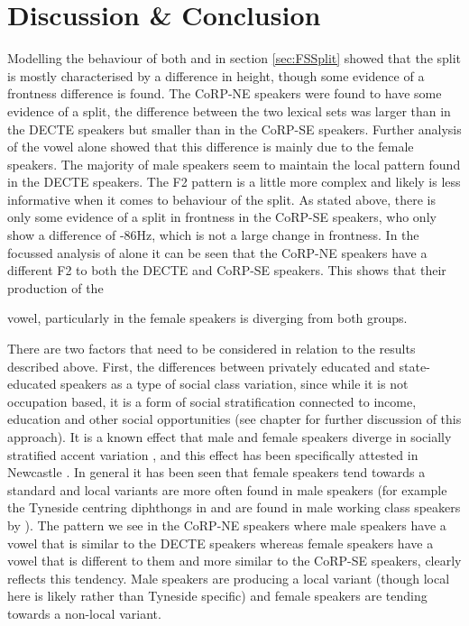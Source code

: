 \documentclass[../../../00.FullDoc/tex/ThesisSkeleton-draft2]{subfiles}
\begin{document}
\begin{figure}[h]
	
	\caption{} \label{fig:strutF2-sex}
\end{figure}

\section{Discussion \& Conclusion}
Modelling the behaviour of both \foot{} and \strutt{} in section \ref{sec:FSSplit} showed that the \FS{} split is mostly characterised by a difference in height, though some evidence of a frontness difference is found. The CoRP-NE speakers were found to have some evidence of a \FS{} split, the difference between the two lexical sets was larger than in the DECTE speakers but smaller than in the CoRP-SE speakers. Further analysis of the \strutt{} vowel alone showed that this difference is mainly due to the female speakers. The majority of male speakers seem to maintain the local pattern found in the DECTE speakers. The F2 pattern is a little more complex and likely is less informative when it comes to behaviour of the \FS{} split. As stated above, there is only some evidence of a split in frontness in the CoRP-SE speakers, who only show a difference of -86Hz, which is not a large change in frontness. In the focussed analysis of \strutt{} alone it can be seen that the CoRP-NE speakers have a different F2 to both the DECTE and CoRP-SE speakers. This shows that their production of the \strut{} vowel, particularly in the female speakers is diverging from both groups.

There are two factors that need to be considered in relation to the results described above.
First, the differences between privately educated and state-educated speakers as a type of social class variation, since while it is not occupation based, it is a form of social stratification connected to income, education and other social opportunities (see chapter \notinsubfile{\ref{ch:LitReviewSocio}} for further discussion of this approach). It is a known effect that male and female speakers diverge in socially stratified accent variation \citep{Labov2001b}, and this effect has been specifically attested in Newcastle \citep{Watt1998}. In general it has been seen that female speakers tend towards a standard and local variants are more often found in male speakers (for example the Tyneside centring diphthongs in \goat{} and  are found in male working class speakers by \cite{Watt1998}). The pattern we see in the CoRP-NE speakers where male speakers have a \strutt{} vowel that is similar to the DECTE speakers whereas female speakers have a \strutt{} vowel that is different to them and more similar to the CoRP-SE speakers, clearly reflects this tendency. Male speakers are producing a local variant (though local here is likely  rather than Tyneside specific) and female speakers are tending towards a non-local variant.
\end{document}
